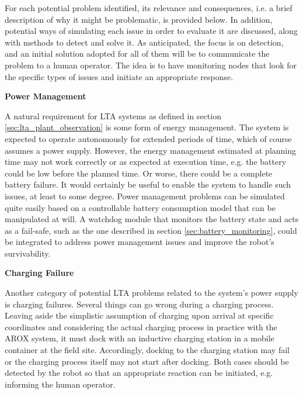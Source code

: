 \documentclass[english, master, utf8]{base/thesis_KBS}
\begin{document}
For each potential problem identified, its relevance and consequences, i.e. a brief description of why it might be problematic, is provided below.
In addition, potential ways of simulating each issue in order to evaluate it are discussed, along with methods to detect and solve it.
As anticipated, the focus is on detection, and an initial solution adopted for all of them will be to communicate the problem to a human operator.
The idea is to have monitoring nodes that look for the specific types of issues and initiate an appropriate response.\newline

\noindent
\textbf{Power Management}\newline

\noindent
A natural requirement for LTA systems as defined in section \ref{sec:lta_plant_observation} is some form of energy management.
The system is expected to operate autonomously for extended periods of time, which of course assumes a power supply. 
However, the energy management estimated at planning time may not work correctly or as expected at execution time, e.g. the battery could be 
low before the planned time. Or worse, there could be a complete battery failure. It would certainly be useful to enable the system to handle such issues, at least to 
some degree. Power management problems can be simulated quite easily based on a controllable battery consumption model that can be manipulated at will.
A watchdog module that monitors the battery state and acts as a fail-safe, such as the one described in section \ref{sec:battery_monitoring}, could be 
integrated to address power management issues and improve the robot's survivability.\newline

\noindent
\textbf{Charging Failure}\newline

\noindent
Another category of potential LTA problems related to the system's power supply is charging failures. Several things can go wrong during a charging process. 
Leaving aside the simplistic assumption of charging upon arrival at specific coordinates and considering the actual charging process 
in practice with the AROX system, it must dock with an inductive charging station in a mobile container at the field site.
Accordingly, docking to the charging station may fail or the charging process itself may not start after docking.
Both cases should be detected by the robot so that an appropriate reaction can be initiated, e.g. informing the human operator.\newline
\end{document}
